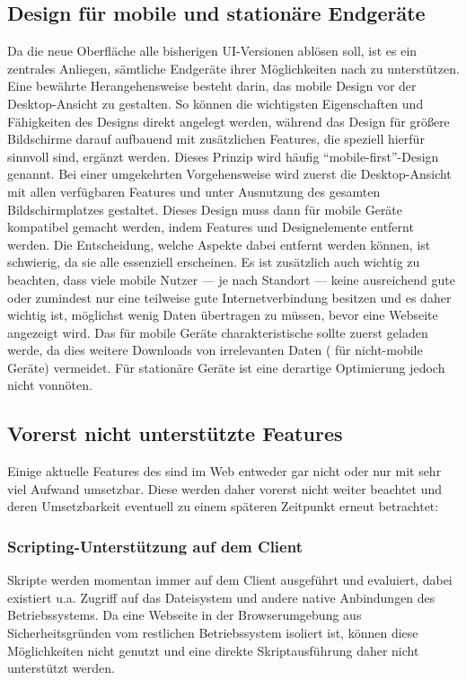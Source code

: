 \subsection{Design für mobile und stationäre Endgeräte}
Da die neue Oberfläche alle bisherigen UI-Versionen ablösen soll, ist es ein zentrales Anliegen, sämtliche Endgeräte ihrer Möglichkeiten nach zu unterstützen. Eine bewährte Herangehensweise besteht darin, das mobile Design vor der Desktop-Ansicht zu gestalten. So können die wichtigsten Eigenschaften und Fähigkeiten des Designs direkt angelegt werden, während das Design für größere Bildschirme darauf aufbauend mit zusätzlichen Features, die speziell hierfür sinnvoll sind, ergänzt werden. Dieses Prinzip wird häufig \enquote{mobile-first}-Design genannt. Bei einer umgekehrten Vorgehensweise wird zuerst die Desktop-Ansicht mit allen verfügbaren Features und unter Ausnutzung des gesamten Bildschirmplatzes gestaltet. Dieses Design muss dann für mobile Geräte kompatibel gemacht werden, indem Features und Designelemente entfernt werden. Die Entscheidung, welche Aspekte dabei entfernt werden können, ist schwierig, da sie alle essenziell erscheinen.
Es ist zusätzlich auch wichtig zu beachten, dass viele mobile Nutzer --- je nach Standort --- keine ausreichend gute oder zumindest nur eine teilweise gute Internetverbindung besitzen und es daher wichtig ist, möglichst wenig Daten übertragen zu müssen, bevor eine Webseite angezeigt wird. Das für mobile Geräte charakteristische  sollte zuerst geladen werde, da dies weitere Downloads von irrelevanten Daten ( für nicht-mobile Geräte) vermeidet. Für stationäre Geräte ist eine derartige Optimierung jedoch nicht vonnöten.

\subsection{Vorerst nicht unterstützte Features}
Einige aktuelle Features des  sind im Web entweder gar nicht oder nur mit sehr viel Aufwand umsetzbar. Diese werden daher vorerst nicht weiter beachtet und deren Umsetzbarkeit eventuell zu einem späteren Zeitpunkt erneut betrachtet:

\subsubsection{Scripting-Unterstützung auf dem Client}
Skripte werden momentan immer auf dem Client ausgeführt und evaluiert, dabei existiert u.a. Zugriff auf das Dateisystem und andere native Anbindungen des Betriebssystems. Da eine Webseite in der Browserumgebung aus Sicherheitsgründen vom restlichen Betriebssystem isoliert ist, können diese Möglichkeiten nicht genutzt und eine direkte Skriptausführung daher nicht unterstützt werden. 

